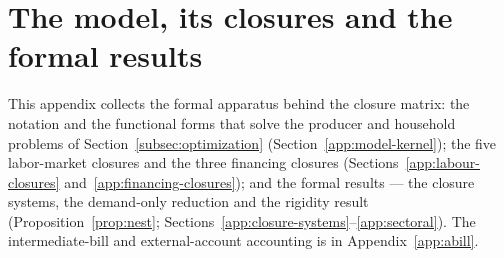 
\section{The model, its closures and the formal results}\label{app:proofs}

\noindent
This appendix collects the formal apparatus behind the closure matrix: the
notation and the functional forms that solve the producer and household
problems of Section~\ref{subsec:optimization}
(Section~\ref{app:model-kernel}); the five labor-market closures and the
three financing closures (Sections~\ref{app:labour-closures}
and~\ref{app:financing-closures}); and the formal results --- the closure
systems, the demand-only reduction and the rigidity result
(Proposition~\ref{prop:nest};
Sections~\ref{app:closure-systems}--\ref{app:sectoral}). The
intermediate-bill and external-account accounting is in
Appendix~\ref{app:abill}.


